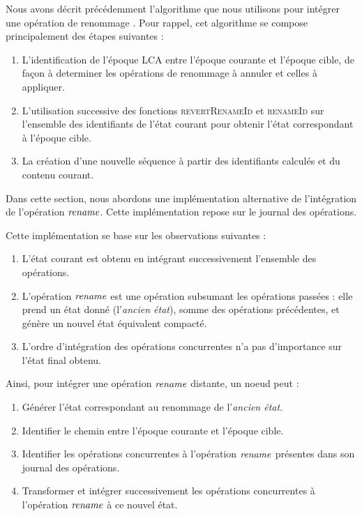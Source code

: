 Nous avons décrit précédemment l'algorithme que nous utilisons pour intégrer une opération de renommage .
Pour rappel, cet algorithme se compose principalement des étapes suivantes :
\begin{enumerate}
  \item L'identification de l'époque \ac{LCA} entre l'époque courante et l'époque cible, de façon à determiner les opérations de renommage à annuler et celles à appliquer.
  \item L'utilisation successive des fonctions \textsc{revertRenameId} et \textsc{renameId} sur l'ensemble des identifiants de l'état courant pour obtenir l'état correspondant à l'époque cible.
  \item La création d'une nouvelle séquence à partir des identifiants calculés et du contenu courant.
\end{enumerate}

Dans cette section, nous abordons une implémentation alternative de l'intégration de l'opération $\mathit{rename}$.
Cette implémentation repose sur le journal des opérations.

Cette implémentation se base sur les observations suivantes :
\begin{enumerate}
  \item L'état courant est obtenu en intégrant successivement l'ensemble des opérations.
  \item L'opération $\mathit{rename}$ est une opération subsumant les opérations passées : elle prend un état donné (l'\emph{ancien état}), somme des opérations précédentes, et génère un nouvel état équivalent compacté.
  \item L'ordre d'intégration des opérations concurrentes n'a pas d'importance sur l'état final obtenu.
\end{enumerate}

Ainsi, pour intégrer une opération $\mathit{rename}$ distante, un noeud peut :
\begin{enumerate}
  \item Générer l'état correspondant au renommage de l'\emph{ancien état}.
  \item Identifier le chemin entre l'époque courante et l'époque cible.
  \item Identifier les opérations concurrentes à l'opération $\mathit{rename}$ présentes dans son journal des opérations.
  \item Transformer et intégrer successivement les opérations concurrentes à l'opération $\mathit{rename}$ à ce nouvel état.
\end{enumerate}

